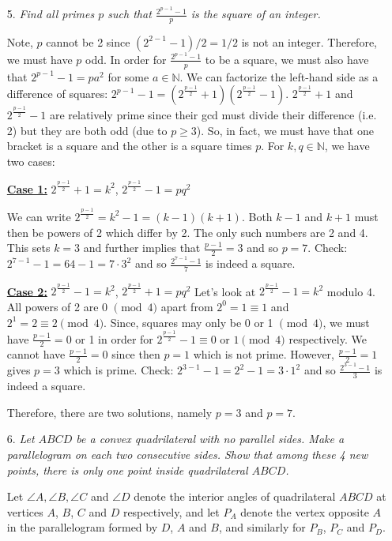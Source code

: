 \documentclass[a4paper,12pt]{article}
\begin{document}
\begin{enumerate}
  \item[5.] \emph{Find all primes $p$ such that $\displaystyle \frac{2^{p-1}-1}{p}$ is the square of an integer.}
  
  Note, $p$ cannot be 2 since $(2^{2-1}-1)/2 =  1/2$ is not an integer. Therefore, we must have $p$ odd. In order for $\frac{2^{p-1}-1}{p}$ to be a square, we must also have that $2^{p-1}-1 = p a^2$ for some $a\in \mathbb{N}$. We can factorize the left-hand side as a difference of squares:  $2^{p-1}-1 = (2^\frac{p-1}{2}+1)(2^\frac{p-1}{2}-1)$. $2^\frac{p-1}{2}+1$ and $2^\frac{p-1}{2}-1$ are relatively prime since their gcd must divide their difference (i.e. 2) but they are both odd (due to $p\geq 3$). So, in fact, we must have that one bracket is a square and the other is a square times $p$. For $k,q \in \mathbb{N}$, we have two cases:
  
  \underline{\textbf{Case 1:}} $2^\frac{p-1}{2}+1=k^2$, $2^\frac{p-1}{2}-1 = pq^2$

We can write $2^\frac{p-1}{2} = k^2-1 = (k-1)(k+1)$. Both $k-1$ and $k+1$ must then be powers of 2 which differ by 2. The only such numbers are 2 and 4. This sets $k=3$ and further implies that $\frac{p-1}{2}=3$ and so $p=7$. Check: $2^{7-1}-1 = 64-1 = 7\cdot 3^2$ and so $\frac{2^{7-1}-1}{7}$ is indeed a square.
  
  \underline{\textbf{Case 2:}} $2^\frac{p-1}{2}-1=k^2$, $2^\frac{p-1}{2}+1 = pq^2$
  Let's look at $2^\frac{p-1}{2}-1=k^2$ modulo 4. All powers of 2 are 0 $\pmod{4}$ apart from $2^0=1 \equiv 1$ and $2^1=2 \equiv 2 \pmod{4}$. Since, squares may only be 0 or 1 $\pmod{4}$, we must have $\frac{p-1}{2} = 0$ or 1 in order for $2^\frac{p-1}{2}-1 \equiv 0$ or $1 \pmod{4}$ respectively. We cannot have $\frac{p-1}{2} = 0$ since then $p=1$ which is not prime. However, $\frac{p-1}{2} = 1$ gives $p=3$ which is prime. Check: $2^{3-1}-1 = 2^2-1 = 3\cdot 1^2$ and so $\frac{2^{3-1}-1}{3}$ is indeed a square. 
  
  Therefore, there are two solutions, namely $p=3$ and $p=7$.
  
  
  \item[6.] \emph{Let $ABCD$ be a convex quadrilateral with no parallel sides. Make a parallelogram on each two consecutive sides. Show that among these 4 new points, there is only one point inside quadrilateral $ABCD$.}
  
  Let $\angle A, \angle B, \angle C$ and $\angle D$ denote the interior angles of quadrilateral $ABCD$ at vertices $A$, $B$, $C$ and $D$ respectively, and let $P_A$ denote the vertex opposite $A$ in the parallelogram formed by $D$, $A$ and $B$, and similarly for $P_B$, $P_C$ and $P_D$.
  

\end{enumerate}
\end{document}
